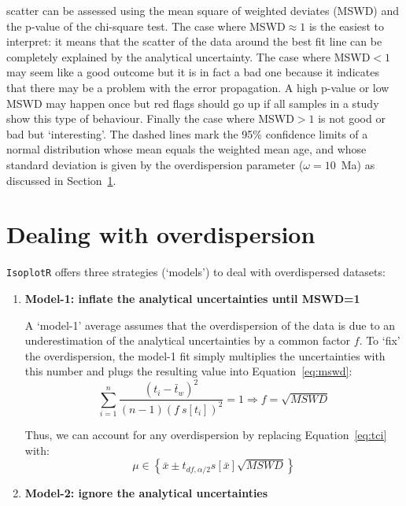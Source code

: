 \begin{refsection}
\begin{minipage}[t]{.58\textwidth}
{    scatter can be assessed using the mean square of weighted deviates
    (MSWD) and the p-value of the chi-square test. The case where
    MSWD$\approx{1}$ is the easiest to interpret: it means that the
    scatter of the data around the best fit line can be completely
    explained by the analytical uncertainty. The case where MSWD$<{1}$
    may seem like a good outcome but it is in fact a bad one because
    it indicates that there may be a problem with the error
    propagation. A high p-value or low MSWD may happen once but red
    flags should go up if all samples in a study show this type of
    behaviour. Finally the case where MSWD$>{1}$ is not good or bad
    but `interesting'. The dashed lines mark the 95\% confidence
    limits of a normal distribution whose mean equals the weighted
    mean age, and whose standard deviation is given by the
    overdispersion parameter ($\omega=10$~Ma) as discussed in
    Section~\ref{sec:overdispersion}.}
  \label{fig:wtdmeanMSWD}
\end{minipage}

\section{Dealing with overdispersion}
\label{sec:overdispersion}

\texttt{IsoplotR} offers three strategies (`models') to deal with
overdispersed datasets:

\begin{enumerate}
\item\textbf{Model-1: inflate the analytical uncertainties until MSWD=1}

  A `model-1' average assumes that the overdispersion of the data is due
  to an underestimation of the analytical uncertainties by a common
  factor $f$. To `fix' the overdispersion, the model-1 fit simply
  multiplies the uncertainties with this number and plugs the resulting
  value into Equation~\ref{eq:mswd}:
  \[
  \sum\limits_{i=1}^{n}\frac{(t_i-\bar{t}_w)^2}{(n-1) (f~s[t_i])^2} = 1
  \Rightarrow f = \sqrt{MSWD}
  \]

  Thus, we can account for any overdispersion by replacing
  Equation~\ref{eq:tci} with:
  \begin{equation}
    \mu \in \left\{\bar{x} \pm t_{df,\alpha/2} s[\bar{x}] \sqrt{MSWD} \right\}
    \label{eq:tci}
  \end{equation}

\item\textbf{Model-2: ignore the analytical uncertainties}
  

\end{enumerate}
\end{refsection}
